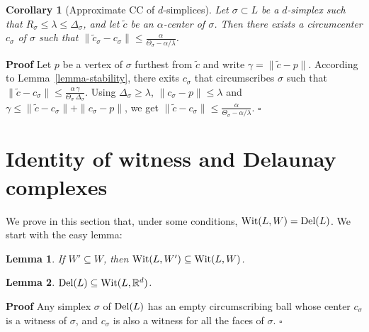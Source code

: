 \documentclass[11pt,a4paper]{article}
\newtheorem{lemma}{Lemma}
\newtheorem{corol}{Corollary}
\newenvironment{proof}
        {\noindent \textbf{Proof} \hspace{0.3mm}}
        {\hspace{0.3mm}$\square$  \smallskip}
\newcommand{\R}{\mathbb R}
\newcommand{\del}{{\rm Del}}
\newcommand{\wit}{{\rm Wit}}
\begin{document}

\begin{corol}[Approximate CC of $d$-simplices]
Let $\sigma\subset L$ be a $d$-simplex such that $R_{\sigma}\leq
\lambda \leq  \Delta_{\sigma}$, and let
$\tilde{c}$ be an $\alpha$-center of $\sigma$. %
Then there exists a circumcenter  $c_{\sigma}$ of $\sigma$ such
that $\| \tilde{c}_{\sigma}-c_{\sigma}\| 
\leq \frac{\alpha}{\Theta_{\sigma}-\alpha/\lambda} $. 
\label{lemma-stability2}
\end{corol}

\begin{proof}
Let $p$ be a vertex of $\sigma$ furthest from $\tilde{c}$ and write
$\gamma= \| \tilde{c}-p\|$. According to Lemma~\ref{lemma-stability},
there exits  $c_{\sigma}$ that circumscribes $\sigma$ such
that $\| \tilde{c}-c_{\sigma}\| \leq \frac{\alpha\,
  \gamma}{\Theta_{\sigma} \, \Delta_{\sigma}}$.  
Using $\Delta_{\sigma}\geq \lambda$, $\| c_{\sigma} -p\|\leq \lambda$ and
$\gamma \leq \| \tilde{c}-c_{\sigma}\| + \| c_{\sigma} -p\|$, we get
$\| \tilde{c}-c_{\sigma}\| \leq \frac{\alpha}{\Theta_{\sigma}-\alpha/\lambda}$.
\end{proof}



\section{Identity of witness and Delaunay complexes}

We prove in this section that, under some conditions, $\wit
(L,W)=\del(L)$. We start with the easy lemma:


\begin{lemma}
\label{lemma-easy}
If $W'\subseteq W$, then $\wit (L,W') \subseteq \wit (L,W)$.
\end{lemma}

\begin{lemma}
\label{lemma-subset}
$\del (L) \subseteq \wit (L,\R^d)$.
\end{lemma}

\begin{proof}
 Any simplex $\sigma$ of $\del(L)$  has an empty circumscribing ball whose
center $c_{\sigma}$ is a witness of $\sigma$, and  $c_{\sigma}$ is also a
witness for all the faces of $\sigma$. 
\end{proof}
\end{document}
